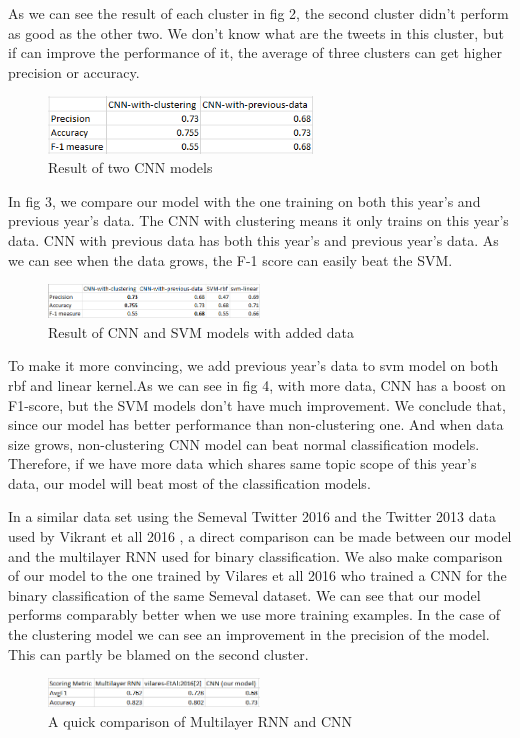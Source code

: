 \documentclass[conference]{IEEEtran}
\begin{document}
As we can see the result of each cluster in fig 2, the second cluster didn't perform as good as the other two. We don't know what are the tweets in this cluster, but if can improve the performance of it, the average of three clusters can get higher precision or accuracy.

\begin{figure}[h]
\centering
\includegraphics[width=70mm,scale=0.5]{Capture(4)}
\caption{Result of two CNN models}
\end{figure}

In fig 3, we compare our model with the one training on both this year's and previous year's data. The CNN with clustering means it only trains on this year's data. CNN with previous data has both this year's and previous year's data. As we can see when the data grows, the F-1 score can easily beat the SVM. 

\begin{figure}[h]
\centering
\includegraphics[width=0.5\textwidth]{Capture(5)}
\caption{Result of CNN and SVM models with added data}
\end{figure}


To make it more convincing, we add previous year's data to svm model on both rbf and linear kernel.As we can see in fig 4, with more data, CNN has a boost on F1-score, but the SVM models don't have much improvement. We conclude that, since our model has better performance than non-clustering one. And when data size grows, non-clustering CNN model can beat normal classification models. Therefore, if we have more data which shares same topic scope of this year's data, our model will beat most of the classification models.


In a similar data set using the Semeval Twitter 2016 and the Twitter 2013 data used by Vikrant et all 2016 , a direct comparison can be made between our model and the multilayer RNN used for binary classification. We also make comparison of our model to the one trained by Vilares et all 2016 who trained a CNN for the binary classification of the same Semeval dataset. We can see that our model performs comparably better when we use more training examples. In the case of the clustering model we can see an improvement in the precision of the model. This can partly be blamed on the second cluster.  
\begin{figure}[h]
\centering
\includegraphics[width=0.5\textwidth]{Capture(6)}
\caption{A quick comparison of Multilayer RNN and CNN}
\end{figure}
\end{document}
